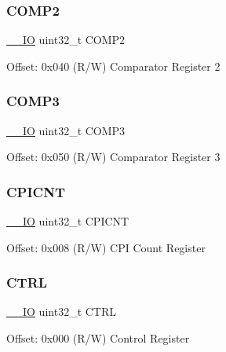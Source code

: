 \subsubsection{\texorpdfstring{COMP2}{COMP2}}
{\footnotesize\ttfamily \mbox{\hyperlink{core__sc300_8h_aec43007d9998a0a0e01faede4133d6be}{\+\_\+\+\_\+\+IO}} uint32\+\_\+t C\+O\+M\+P2}

Offset\+: 0x040 (R/W) Comparator Register 2 \mbox{\label{struct_d_w_t___type_a923d50abd92dbc50ef2983770489eafd}} 
\subsubsection{\texorpdfstring{COMP3}{COMP3}}
{\footnotesize\ttfamily \mbox{\hyperlink{core__sc300_8h_aec43007d9998a0a0e01faede4133d6be}{\+\_\+\+\_\+\+IO}} uint32\+\_\+t C\+O\+M\+P3}

Offset\+: 0x050 (R/W) Comparator Register 3 \mbox{\label{struct_d_w_t___type_a49a1dced8d644fa6f4128570f102212e}} 
\subsubsection{\texorpdfstring{CPICNT}{CPICNT}}
{\footnotesize\ttfamily \mbox{\hyperlink{core__sc300_8h_aec43007d9998a0a0e01faede4133d6be}{\+\_\+\+\_\+\+IO}} uint32\+\_\+t C\+P\+I\+C\+NT}

Offset\+: 0x008 (R/W) C\+PI Count Register \mbox{\label{struct_d_w_t___type_a15fc8d35f045f329b80c544bef35ff64}} 
\subsubsection{\texorpdfstring{CTRL}{CTRL}}
{\footnotesize\ttfamily \mbox{\hyperlink{core__sc300_8h_aec43007d9998a0a0e01faede4133d6be}{\+\_\+\+\_\+\+IO}} uint32\+\_\+t C\+T\+RL}

Offset\+: 0x000 (R/W) Control Register \mbox{\label{struct_d_w_t___type_acf6d1c3e5f5cef92986fd9cfae5c7224}} 
